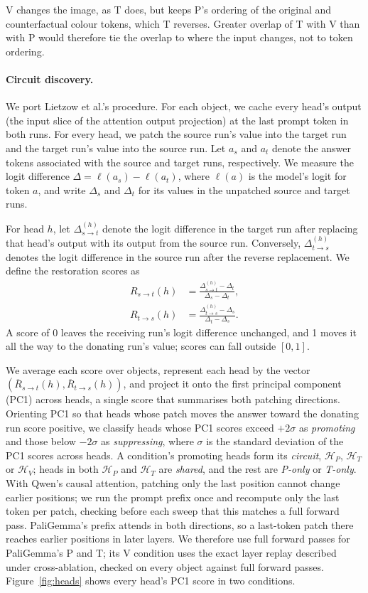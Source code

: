\documentclass[letterpaper]{article}
\newcommand{\HP}{\mathcal{H}_P}
\newcommand{\HT}{\mathcal{H}_T}
\newcommand{\HV}{\mathcal{H}_V}
\begin{document}
V changes the image, as T does, but keeps P's ordering of the original and
counterfactual colour tokens, which T reverses. Greater overlap of T with V than
with P would therefore tie the overlap to where the input changes, not to token
ordering.

\paragraph{Circuit discovery.}
We port Lietzow et al.'s procedure. For each object, we cache every head's output
(the input slice of the attention output projection) at the last prompt token
in both runs. For every head, we patch the source run's value into the target
run and the target run's value into the source run. Let $a_s$ and $a_t$ denote the answer tokens associated with the
source and target runs, respectively. We measure the logit
difference $\Delta = \ell(a_s) - \ell(a_t)$, where $\ell(a)$ is
the model's logit for token $a$, and write $\Delta_s$ and $\Delta_t$ for its
values in the unpatched source and target runs.

For head $h$, let $\Delta_{s\to t}^{(h)}$ denote the logit
difference in the target run after replacing that head's output
with its output from the source run. Conversely,
$\Delta_{t\to s}^{(h)}$ denotes the logit difference in the source
run after the reverse replacement. We define the restoration
scores as
\begin{align}
R_{s\to t}(h)
&= \frac{\Delta_{s\to t}^{(h)}-\Delta_t}
         {\Delta_s-\Delta_t}, \\
R_{t\to s}(h)
&= \frac{\Delta_{t\to s}^{(h)}-\Delta_s}
         {\Delta_t-\Delta_s}.
\end{align}
A score of 0 leaves the receiving run's logit difference unchanged, and 1 moves
it all the way to the donating run's value; scores can fall outside $[0,1]$.

We average each score over objects, represent each head by the vector
$(\overline{R}_{s\to t}(h),\overline{R}_{t\to s}(h))$, and project it onto the
first principal component (PC1) across heads, a single score that summarises
both patching directions. Orienting PC1 so that heads whose patch moves the
answer toward the donating run score positive, we classify heads
whose PC1 scores exceed $+2\sigma$ as \emph{promoting} and those
below $-2\sigma$ as \emph{suppressing}, where $\sigma$ is the
standard deviation of the PC1 scores across heads. A condition's promoting
heads form its \emph{circuit}, $\HP$, $\HT$ or $\HV$; heads in both $\HP$ and
$\HT$ are \emph{shared}, and the rest are \emph{P-only} or \emph{T-only}. With Qwen's causal attention, patching only
the last position cannot change earlier positions; we run the prompt prefix
once and recompute only the last token per patch, checking before each sweep
that this matches a full forward pass. PaliGemma's prefix attends in both
directions, so a last-token patch there reaches earlier positions in later
layers. We therefore use full forward passes for PaliGemma's P and T; its V
condition uses the exact layer replay described under cross-ablation, checked
on every object against full forward passes. Figure~\ref{fig:heads} shows every head's PC1 score in two conditions.
\end{document}

